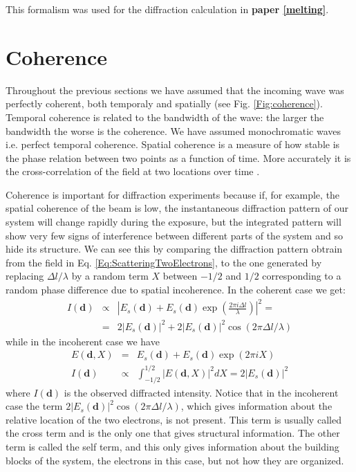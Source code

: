 This formalism was used for the diffraction calculation in {\bf paper \ref{melting}}.

\section{Coherence}\label{coherence}

Throughout the previous sections we have assumed that the incoming wave was
perfectly coherent, both temporaly and spatially (see Fig. \ref{Fig:coherence}). Temporal coherence is related
to the bandwidth of the wave: the larger the bandwidth the worse is the
coherence. We have assumed monochromatic waves i.e. perfect temporal
coherence. Spatial coherence is a measure of how stable is the phase relation between
two points as a function of time. More accurately it is the cross-correlation of the field at two locations over time \cite{Attwood2007Soft}. 

Coherence is important for diffraction experiments \cite{HauRiege2008Effect,Whitehead2009Diffractive} because if, for example, the
spatial coherence of the beam is low, the instantaneous diffraction pattern of
our system will change rapidly during the exposure, but the integrated pattern
will show very few signs of interference between different parts of the
system and so hide its structure. We can see this by comparing the diffraction
pattern obtrain from the field in Eq. \ref{Eq:ScatteringTwoElectrons}, to the
one generated by replacing $\Delta l/\lambda$ by a random term $X$
between $-1/2$ and $1/2$ corresponding to a random phase difference due to
spatial incoherence. In the coherent case we get:
\begin{eqnarray}
  I(\mathbf d)  & \propto & |E_s(\mathbf d) + E_s(\mathbf d) \exp(\frac{2 \pi i \Delta
    l}{\lambda})|^2  = \nonumber \\
 & = & 2 |E_s(\mathbf d)|^2 + 2 |E_s(\mathbf d)|^2
  \cos(2 \pi \Delta l / \lambda)
\end{eqnarray}
 while in the incoherent case we have
\begin{eqnarray}
 E(\mathbf d,X) & = &  E_s(\mathbf d) + E_s(\mathbf d) \exp(2 \pi i X) \nonumber
 \\
I(\mathbf d)  & \propto & \int_{-1/2}^{1/2} |E(\mathbf d,X)|^2 dX = 2 |E_s(\mathbf d)|^2
\end{eqnarray}
where $I(\mathbf d)$ is the observed diffracted intensity. Notice that in the
incoherent case the term $2 |E_s(\mathbf d)|^2 \cos(2 \pi \Delta l / \lambda)$,
which gives information about the relative location of the two electrons, is not
present. This term is usually called the cross term and is the only one that
gives structural information. The other term is called the self term, and this only gives
information about the building blocks of the system, the electrons in this case,
but not how they are organized.

